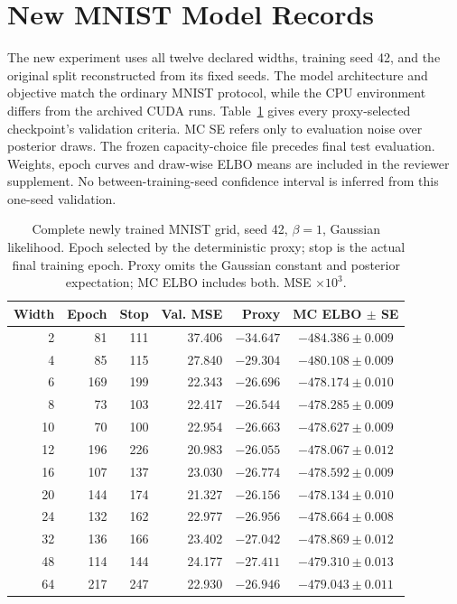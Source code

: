\documentclass[make,article,submit,pdftex,moreauthors]{Definitions/mdpi}
\begin{document}
\section{New MNIST Model Records}\label{app:newmodels}
The new experiment uses all twelve declared widths, training seed 42,
and the original split reconstructed from its fixed seeds. The model
architecture and objective match the ordinary MNIST protocol, while
the CPU environment differs from the archived CUDA runs.
Table~\ref{tab:mcgrid} gives every proxy-selected checkpoint's validation
criteria. MC SE refers only to evaluation noise over posterior draws.
The frozen capacity-choice file precedes final test evaluation.
Weights, epoch curves and draw-wise ELBO means are included in the
reviewer supplement. No between-training-seed confidence interval is
inferred from this one-seed validation.
\begin{table}[H]
\caption{Complete newly trained MNIST grid, seed 42, $\beta=1$, Gaussian likelihood. Epoch selected by the deterministic proxy; stop is the actual final training epoch. Proxy omits the Gaussian constant and posterior expectation; MC ELBO includes both. MSE $\times10^3$.}\label{tab:mcgrid}
\small
\setlength{\tabcolsep}{3pt}
\begin{tabular*}{\textwidth}{@{\extracolsep{\fill}}rrrrrc@{}}
\toprule
Width & Epoch & Stop & Val. MSE & Proxy & MC ELBO $\pm$ SE \\
\midrule
2 & 81 & 111 & 37.406 & $-34.647$ & $-484.386 \pm 0.009$ \\
4 & 85 & 115 & 27.840 & $-29.304$ & $-480.108 \pm 0.009$ \\
6 & 169 & 199 & 22.343 & $-26.696$ & $-478.174 \pm 0.010$ \\
8 & 73 & 103 & 22.417 & $-26.544$ & $-478.285 \pm 0.009$ \\
10 & 70 & 100 & 22.954 & $-26.663$ & $-478.627 \pm 0.009$ \\
12 & 196 & 226 & 20.983 & $-26.055$ & $-478.067 \pm 0.012$ \\
16 & 107 & 137 & 23.030 & $-26.774$ & $-478.592 \pm 0.009$ \\
20 & 144 & 174 & 21.327 & $-26.156$ & $-478.134 \pm 0.010$ \\
24 & 132 & 162 & 22.977 & $-26.956$ & $-478.664 \pm 0.008$ \\
32 & 136 & 166 & 23.402 & $-27.042$ & $-478.869 \pm 0.012$ \\
48 & 114 & 144 & 24.177 & $-27.411$ & $-479.310 \pm 0.013$ \\
64 & 217 & 247 & 22.930 & $-26.946$ & $-479.043 \pm 0.011$ \\
\bottomrule\end{tabular*}
\end{table}
\end{document}
